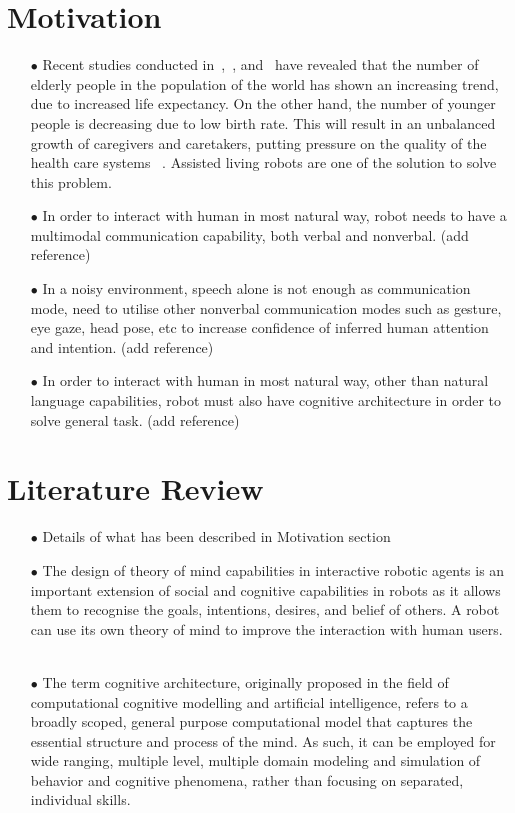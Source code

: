 \documentclass[11pt]{article}
\begin{document}
	\section{Motivation}
		\begin{itemize}
			\item[$\bullet$]Recent studies conducted in~\cite{bemelmans2012socially},~\cite{national1999health}, and~\cite{Sharkey2012} have revealed that the number of elderly people in the population of the world has shown an increasing trend, due to increased life expectancy. On the other hand, the number of younger people is decreasing due to low birth rate. This will result in an unbalanced growth of caregivers and caretakers, putting pressure on the quality of the health care systems ~\cite{bemelmans2012socially}. Assisted living robots are one of the solution to solve this problem.
			\item[$\bullet$]In order to interact with human in most natural way, robot needs to have a multimodal communication capability, both verbal and nonverbal. (add reference)
			\item[$\bullet$]In a noisy environment, speech alone is not enough as communication mode, need to utilise other nonverbal communication modes such as gesture, eye gaze, head pose, etc to increase confidence of inferred human attention and intention. (add reference)
			\item[$\bullet$]In order to interact with human in most natural way, other than natural language capabilities, robot must also have cognitive architecture in order to solve general task. (add reference)
		\end{itemize}
	\section{Literature Review}
		\begin{itemize}
			\item[$\bullet$]Details of what has been described in Motivation section
			\item[$\bullet$]The design of theory of mind capabilities in interactive robotic agents is an important extension of social and cognitive capabilities in robots as it allows them to recognise the goals, intentions, desires, and belief of others. A robot can use its own theory of mind to improve the interaction with human users. ~\cite{scassellati2002theory}
			\item[$\bullet$]The term cognitive architecture, originally proposed in the field of computational cognitive modelling and artificial intelligence, refers to a broadly scoped, general purpose computational model that captures the essential structure and process of the mind. As such, it can be employed for wide ranging, multiple level, multiple domain modeling and simulation of behavior and cognitive phenomena, rather than focusing on separated, individual skills. ~\cite{sun2007importance}
				
		\end{itemize}
\end{document}
